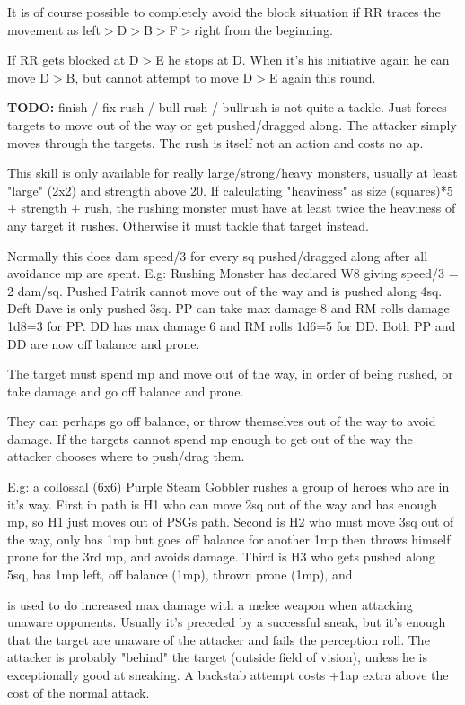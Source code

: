 It is of course possible to completely avoid the block situation if RR traces the movement as left$>$D$>$B$>$F$>$right from the beginning.

If RR gets blocked at D$>$E he stops at D. When it's his initiative again he can move D$>$B, but cannot attempt to move D$>$E again this round.


\textbf{TODO:} finish / fix rush / bull rush / bullrush
 is not quite a tackle. Just forces targets to move out of the way or get pushed/dragged along. The attacker simply moves through the targets. The rush is itself not an action and costs no ap. 

This skill is only available for really large/strong/heavy monsters, usually at least "large" (2x2) and strength above 20. If calculating "heaviness" as size (squares)*5 + strength + rush, the rushing monster must have at least twice the heaviness of any target it rushes. Otherwise it must tackle that target instead.

Normally this does dam speed/3 for every sq pushed/dragged along after all avoidance mp are spent. E.g: Rushing Monster has declared W8 giving speed/3 = 2 dam/sq. Pushed Patrik cannot move out of the way and is pushed along 4sq. Deft Dave is only pushed 3sq. PP can take max damage 8 and RM rolls damage 1d8=3 for PP. DD has max damage 6 and RM rolls 1d6=5 for DD. Both PP and DD are now off balance and prone.


The target must spend mp and move out of the way, in order of being rushed, or take damage and go off balance and prone.

 They can perhaps go off balance, or throw themselves out of the way to avoid damage.
If the targets cannot spend mp enough to get out of the way the attacker chooses where to push/drag them.

E.g: a collossal (6x6) Purple Steam Gobbler rushes a group of heroes who are in it's way. First in path is H1 who can move 2sq out of the way and has enough mp, so H1 just moves out of PSGs path. Second is H2 who must move 3sq out of the way, only has 1mp but goes off balance for another 1mp then throws himself prone for the 3rd mp, and avoids damage. Third is H3 who gets pushed along 5sq, has 1mp left, off balance (1mp), thrown prone (1mp), and


 is used to do increased max damage with a melee weapon when attacking unaware opponents. Usually it's preceded by a successful sneak, but it's enough that the target are unaware of the attacker and fails the perception roll. The attacker is probably "behind" the target (outside field of vision), unless he is exceptionally good at sneaking. A backstab attempt costs +1ap extra above the cost of the normal attack.

